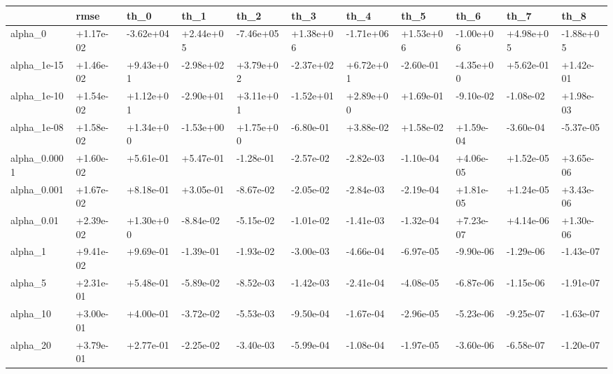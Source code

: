 \begin{tabular}{lllllllllll}
\toprule
{} &      rmse &      th\_0 &      th\_1 &      th\_2 &      th\_3 &      th\_4 &      th\_5 &      th\_6 &      th\_7 &      th\_8 \\
\midrule
alpha\_0      & +1.17e-02 & -3.62e+04 & +2.44e+05 & -7.46e+05 & +1.38e+06 & -1.71e+06 & +1.53e+06 & -1.00e+06 & +4.98e+05 & -1.88e+05 \\
alpha\_1e-15  & +1.46e-02 & +9.43e+01 & -2.98e+02 & +3.79e+02 & -2.37e+02 & +6.72e+01 & -2.60e-01 & -4.35e+00 & +5.62e-01 & +1.42e-01 \\
alpha\_1e-10  & +1.54e-02 & +1.12e+01 & -2.90e+01 & +3.11e+01 & -1.52e+01 & +2.89e+00 & +1.69e-01 & -9.10e-02 & -1.08e-02 & +1.98e-03 \\
alpha\_1e-08  & +1.58e-02 & +1.34e+00 & -1.53e+00 & +1.75e+00 & -6.80e-01 & +3.88e-02 & +1.58e-02 & +1.59e-04 & -3.60e-04 & -5.37e-05 \\
alpha\_0.0001 & +1.60e-02 & +5.61e-01 & +5.47e-01 & -1.28e-01 & -2.57e-02 & -2.82e-03 & -1.10e-04 & +4.06e-05 & +1.52e-05 & +3.65e-06 \\
alpha\_0.001  & +1.67e-02 & +8.18e-01 & +3.05e-01 & -8.67e-02 & -2.05e-02 & -2.84e-03 & -2.19e-04 & +1.81e-05 & +1.24e-05 & +3.43e-06 \\
alpha\_0.01   & +2.39e-02 & +1.30e+00 & -8.84e-02 & -5.15e-02 & -1.01e-02 & -1.41e-03 & -1.32e-04 & +7.23e-07 & +4.14e-06 & +1.30e-06 \\
alpha\_1      & +9.41e-02 & +9.69e-01 & -1.39e-01 & -1.93e-02 & -3.00e-03 & -4.66e-04 & -6.97e-05 & -9.90e-06 & -1.29e-06 & -1.43e-07 \\
alpha\_5      & +2.31e-01 & +5.48e-01 & -5.89e-02 & -8.52e-03 & -1.42e-03 & -2.41e-04 & -4.08e-05 & -6.87e-06 & -1.15e-06 & -1.91e-07 \\
alpha\_10     & +3.00e-01 & +4.00e-01 & -3.72e-02 & -5.53e-03 & -9.50e-04 & -1.67e-04 & -2.96e-05 & -5.23e-06 & -9.25e-07 & -1.63e-07 \\
alpha\_20     & +3.79e-01 & +2.77e-01 & -2.25e-02 & -3.40e-03 & -5.99e-04 & -1.08e-04 & -1.97e-05 & -3.60e-06 & -6.58e-07 & -1.20e-07 \\
\bottomrule
\end{tabular}

